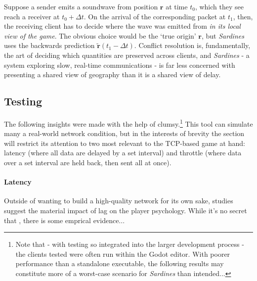 \documentclass[a4paper, 9pt]{article}
\begin{document}
\begin{flushleft}
\vspace{5pt}\noindent
Suppose a sender emits a soundwave from position $\mathbf{r}$ at time $t_0$, which they see reach a receiver at $t_0+\Delta t$. On the arrival of the corresponding packet at $t_1$, then, the receiving client has to decide where the wave was emitted from \textit{in its local view of the game}. The obvious choice would be the `true origin' $\mathbf{r}$, but \textit{Sardines} uses the backwards prediction $\mathbf{\tilde{r}}(t_1-\Delta t)$. Conflict resolution is, fundamentally, the art of deciding which quantities are preserved across clients, and \textit{Sardines} - a system exploring slow, real-time communications - is far less concerned with presenting a shared view of geography than it is a shared view of delay.

\subsection*{Testing}\label{Testing}

\vspace{5pt}\noindent
The following insights were made with the help of clumsy.\footnote{Note that - with testing so integrated into the larger development process - the clients tested were often run within the Godot editor. With poorer performance than a standalone executable, the following results may constitute more of a worst-case scenario for \textit{Sardines} than intended...} This tool can simulate many a real-world network condition, but in the interests of brevity the section will restrict its attention to two most relevant to the TCP-based game at hand: latency (where all data are delayed by a set interval) and throttle (where data over a set interval are held back, then sent all at once).

\paragraph{Latency} Outside of wanting to build a high-quality network for its own sake, studies suggest the material impact of lag on the player psychology. While it's no secret that , there is some emprical evidence...



\end{flushleft}
\end{document}
